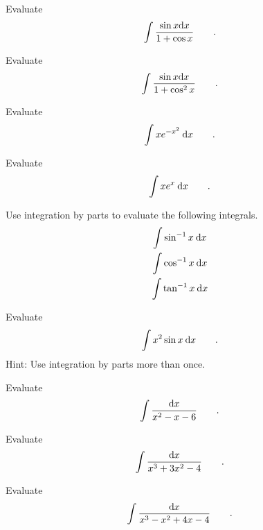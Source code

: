 \begin{hwsection}
\begin{hw}
Evaluate
\begin{equation*}
  \int \frac{\sin x \textup{d} x}{1+\cos x} \qquad .
\end{equation*}
\end{hw}

\begin{hw}
Evaluate
\begin{equation*}
  \int \frac{\sin x \textup{d} x}{1+\cos^2 x} \qquad .
\end{equation*}
\end{hw}

\begin{hw}
Evaluate
\begin{equation*}
  \int x e^{-x^2} \:\textup{d} x \qquad .
\end{equation*}
\end{hw}

\begin{hw}
Evaluate
\begin{equation*}
  \int x e^x \:\textup{d} x \qquad .
\end{equation*}
\end{hw}

\begin{hw}
Use integration by parts to evaluate the following integrals.
\begin{gather*}
  \int \sin^{-1} x\:\textup{d} x \\
  \int \cos^{-1} x\:\textup{d} x \\
  \int \tan^{-1} x\:\textup{d} x 
\end{gather*}
\end{hw}

\begin{hw}
Evaluate
\begin{equation*}
  \int x^2 \sin x \:\textup{d} x \qquad .
\end{equation*}
Hint: Use integration by parts more than once.
\end{hw}

\begin{hw}
Evaluate
\begin{equation*}
  \int \frac{\textup{d} x}{x^2-x-6} \qquad .
\end{equation*}
\end{hw}

\begin{hw}
Evaluate
\begin{equation*}
  \int \frac{\textup{d} x}{x^3+3x^2-4} \qquad .
\end{equation*}
\end{hw}

\begin{hw}
Evaluate
\begin{equation*}
  \int \frac{\textup{d} x}{x^3-x^2+4x-4} \qquad .
\end{equation*}
\end{hw}

\end{hwsection}
